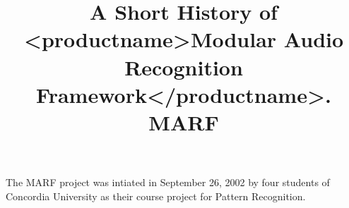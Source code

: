 \title{A Short History of <productname>Modular Audio Recognition Framework</productname>. MARF}

\par
The MARF project was intiated in September 26, 2002 by four students of
Concordia University as their course project for Pattern Recognition.
